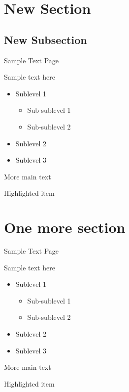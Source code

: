 \documentclass[aspectratio=169]{beamer}
\begin{document}
		\section{New Section}
		
		\subsection{New Subsection}
		
        \begin{frame}{Sample Text Page}
            \begin{vfilleditems}
                \item Sample text here
                \begin{itemize}
                    \item Sublevel 1
                    \begin{itemize}
                             	\item Sub-sublevel 1
                             	\item Sub-sublevel 2
                    \end{itemize}
                    \item Sublevel 2
                    \item Sublevel 3
                \end{itemize}
                \item More main text
                \item \alert{Highlighted item}
            \end{vfilleditems}
        \end{frame}
        
        \section{One more section}
        
        \begin{frame}{Sample Text Page}
        	\begin{vfilleditems}
        		\item Sample text here
        		\begin{itemize}
        			\item Sublevel 1
        			\begin{itemize}
        				\item Sub-sublevel 1
        				\item Sub-sublevel 2
        			\end{itemize}
        			\item Sublevel 2
        			\item Sublevel 3
        		\end{itemize}
        		\item More main text
        		\item \alert{Highlighted item}
        	\end{vfilleditems}
        \end{frame}
        
        \lastslide
        
\end{document}
